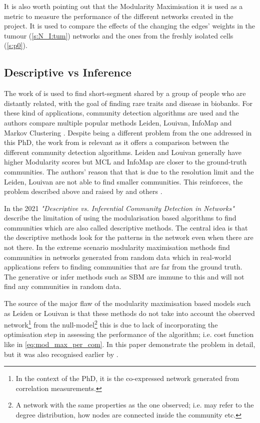 It is also worth pointing out that the Modularity Maximisation it is used as a metric to measure the performance of the different networks created in the project. It is used to compare the effects of the changing the edges' weights in the tumour (\cref{s:N_I:tum}) networks and the ones from the freshly isolated cells (\cref{s:p0}).


\subsection{Descriptive vs Inference} \label{s:lit:descriptive_inference}

The work of \citet{Shemirani2023-ww} is used to find short-segment shared by a group of people who are distantly related, with the goal of finding rare traits and disease in biobanks. For these kind of applications, community detection algorithms are used and the authors compare multiple popular methods Leiden, Louivan, InfoMap \citep{Rosvall2008-kw} and Markov Clustering \citep{Van_Dongen2008-yj}. Despite being a different problem from the one addressed in this PhD, the work from \citet{Shemirani2023-ww} is relevant as it offers a comparison between the different community detection algorithms. Leiden and Louivan generally have higher Modularity scores but MCL and InfoMap are closer to the ground-truth communities. The authors' reason that that is due to the resolution limit and the Leiden, Louivan are not able to find smaller communities. This reinforces, the problem described above and raised by \citep{Peixoto2021-jx} and others \citep{Fortunato2007-gh, Traag2019-ne}.

In the 2021 \textit{"Descriptive vs. Inferential Community Detection in Networks"} \citep{Peixoto2021-jx} describe the limitation of using the modularisation based algorithms to find communities which are also called descriptive methods. The central idea is that the descriptive methods look for the patterns in the network even when there are not there. In the extreme scenario modularity maximisation methods find communities in networks generated from random data which in real-world applications refers to finding communities that are far from the ground truth. The generative or infer methods such as SBM are immune to this and will not find any communities in random data.

The source of the major flaw of the modularity maximisation based models such as Leiden or Louivan is that these methods do not take into account the observed network\footnote{In the context of the PhD, it is the co-expressed network generated from correlation measurements.} from the null-model\footnote{A network with the same properties as the one observed; i.e. may refer to the degree distribution, how nodes are connected inside the community etc.} this is due to lack of incorporating the optimisation step in assessing the performance of the algorithm; i.e. cost function like in \cref{eq:mod_max_per_com}. In this paper \citet{Peixoto2021-jx} demonstrate the problem in detail, but it was also recognised earlier by \citet{Guimera2004-gv}.

